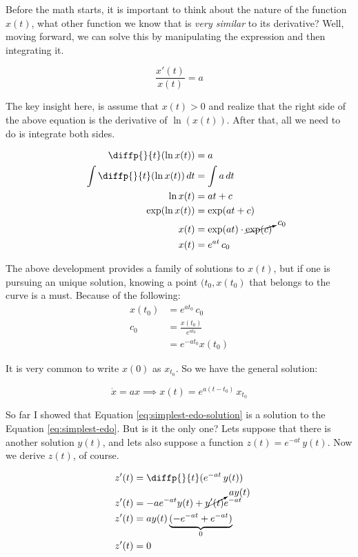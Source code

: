 \documentclass[12pt]{article}
\begin{document}
Before the math starts, it is important to think about the nature of the function $x(t)$, what other function we know that is \textit{very similar} to its derivative? Well, moving forward, we can solve this by manipulating the expression and then integrating it.

\begin{equation*}
    \frac{x'(t)}{x(t)} = a 
\end{equation*}

The key insight here, is assume that $x(t) > 0$ and realize that the right side of the above equation is the derivative of $\ln({x(t)})$. After that, all we need to do is integrate both sides.

\begin{align*}
    \diffp{}{t} (\ln{x(t)}) &= a \\
    \int{\diffp{}{t} (\ln{x(t)}) \, dt} &= \int{a \, dt} \\
    \ln{x(t)} &= at + c \\
    \exp(\ln{x(t)}) &= \exp(at + c) \\
    x(t) &= \exp(at) \cdot \cancelto{c_0}{\exp(c)} \\
    x(t) &= e^{at} \, c_0
\end{align*}

The above development provides a family of solutions to $x(t)$, but if one is pursuing an unique solution, knowing a point $(t_0, x(t_0)$ that belongs to the curve is a must. Because of the following:
\begin{align*}
    x(t_0) &= e^{at_0} \, c_0 \\
    c_0 &= \frac{x(t_0)}{e^{at_0}} \\
        &= e^{-at_0} x(t_0)
\end{align*}

It is very common to write $x(0)$ as $x_{t_0}$. So we have the general solution:

\begin{equation}
    \dot{x} = ax \implies x(t) = e^{a(t - t_0)} \, x_{t_0}
    \label{eq:simplest-edo-solution}
\end{equation}

So far I showed that Equation \ref{eq:simplest-edo-solution} is a solution to the  Equation \ref{eq:simplest-edo}. But is it the only one? Lets suppose that there is another solution $y(t)$, and lets also suppose a function $z(t) = e^{-at} \, y(t)$. Now we derive $z(t)$, of course.

\begin{align*}
    z'(t) &= \diffp{}{t}( e^{-at} \, y(t) ) \\
    z'(t) &= -a e^{-at} y(t) + \cancelto{a y(t)}{y'(t)} e^{-at} \\
    z'(t) &= a y(t) \underbrace{(-e^{-at} + e^{-at})}_\text{$0$}\\
    z'(t) &= 0
\end{align*}
\end{document}
